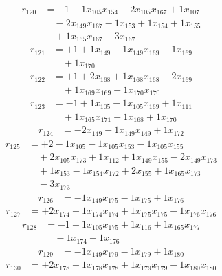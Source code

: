 \[\begin{aligned}
r_{120} &= - 1 - 1 x_{105} x_{154} + 2 x_{105} x_{167} + 1 x_{107} \\
 &\quad - 2 x_{149} x_{167} - 1 x_{153} + 1 x_{154} + 1 x_{155} \\
 &\quad + 1 x_{165} x_{167} - 3 x_{167}
\end{aligned}\]
\[\begin{aligned}
r_{121} &= + 1 + 1 x_{149} - 1 x_{149} x_{169} - 1 x_{169} \\
 &\quad + 1 x_{170}
\end{aligned}\]
\[\begin{aligned}
r_{122} &= + 1 + 2 x_{168} + 1 x_{168} x_{168} - 2 x_{169} \\
 &\quad + 1 x_{169} x_{169} - 1 x_{170} x_{170}
\end{aligned}\]
\[\begin{aligned}
r_{123} &= - 1 + 1 x_{105} - 1 x_{105} x_{169} + 1 x_{111} \\
 &\quad + 1 x_{165} x_{171} - 1 x_{168} + 1 x_{170}
\end{aligned}\]
\[\begin{aligned}
r_{124} &= - 2 x_{149} - 1 x_{149} x_{149} + 1 x_{172}
\end{aligned}\]
\[\begin{aligned}
r_{125} &= + 2 - 1 x_{105} - 1 x_{105} x_{153} - 1 x_{105} x_{155} \\
 &\quad + 2 x_{105} x_{173} + 1 x_{112} + 1 x_{149} x_{155} - 2 x_{149} x_{173} \\
 &\quad + 1 x_{153} - 1 x_{154} x_{172} + 2 x_{155} + 1 x_{165} x_{173} \\
 &\quad - 3 x_{173}
\end{aligned}\]
\[\begin{aligned}
r_{126} &= - 1 x_{149} x_{175} - 1 x_{175} + 1 x_{176}
\end{aligned}\]
\[\begin{aligned}
r_{127} &= + 2 x_{174} + 1 x_{174} x_{174} + 1 x_{175} x_{175} - 1 x_{176} x_{176}
\end{aligned}\]
\[\begin{aligned}
r_{128} &= - 1 - 1 x_{105} x_{175} + 1 x_{116} + 1 x_{165} x_{177} \\
 &\quad - 1 x_{174} + 1 x_{176}
\end{aligned}\]
\[\begin{aligned}
r_{129} &= - 1 x_{149} x_{179} - 1 x_{179} + 1 x_{180}
\end{aligned}\]
\[\begin{aligned}
r_{130} &= + 2 x_{178} + 1 x_{178} x_{178} + 1 x_{179} x_{179} - 1 x_{180} x_{180}
\end{aligned}\]
